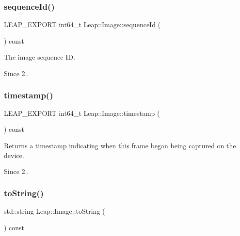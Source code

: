 \subsubsection{\texorpdfstring{sequence\+Id()}{sequenceId()}}
{\footnotesize\ttfamily L\+E\+A\+P\+\_\+\+E\+X\+P\+O\+RT int64\+\_\+t Leap\+::\+Image\+::sequence\+Id (\begin{DoxyParamCaption}{ }\end{DoxyParamCaption}) const}

The image sequence ID.


\begin{DoxyCodeInclude}
\end{DoxyCodeInclude}


\begin{DoxySince}{Since}
2.. 
\end{DoxySince}
\mbox{\label{class_leap_1_1_image_ae6cce7f3c7ebc323543a73f1b9c77dc3}} 
\subsubsection{\texorpdfstring{timestamp()}{timestamp()}}
{\footnotesize\ttfamily L\+E\+A\+P\+\_\+\+E\+X\+P\+O\+RT int64\+\_\+t Leap\+::\+Image\+::timestamp (\begin{DoxyParamCaption}{ }\end{DoxyParamCaption}) const}

Returns a timestamp indicating when this frame began being captured on the device.

\begin{DoxySince}{Since}
2.. 
\end{DoxySince}
\mbox{\label{class_leap_1_1_image_ae46e17c86b9975e29f6cd1a77d7722bd}} 
\subsubsection{\texorpdfstring{to\+String()}{toString()}}
{\footnotesize\ttfamily std\+::string Leap\+::\+Image\+::to\+String (\begin{DoxyParamCaption}{ }\end{DoxyParamCaption}) const\hspace{0.3cm}{\ttfamily [inline]}}

